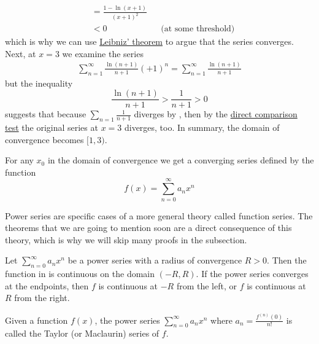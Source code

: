 \begin{exm}
\begin{align*}
		      & = \frac{1-\ln(x+1)}{(x+1)^2}                                                             \\
		      & < 0                                                      &  & \text{(at some threshold)}
	\end{align*}
	which is why we can use \hyperref[thm-leibniz-test]{Leibniz' theorem}
	to argue that the series converges. Next, at $x=3$ we examine the series
	\begin{align*}
		\sum_{n=1}^\infty \frac{\ln(n+1)}{n+1}(+1)^n = \sum_{n=1}^\infty \frac{\ln(n+1)}{n+1}
	\end{align*}
	but the inequality
	\begin{equation*}
		\frac{\ln(n+1)}{n+1} > \frac{1}{n+1} > 0
	\end{equation*}
	suggests that because $\sum_{n=1}\frac{1}{n+1}$ diverges by ,
	then by the \hyperref[thm-direct-comparison-test-series]{direct comparison test} the original series at
	$x=3$ diverges, too. In summary, the domain of convergence becomes $[1,3)$.
\end{exm}

\begin{definition}\label{def-power-series-function}
	For any $x_0$ in the domain of convergence we get a converging series defined by the function
	\begin{equation}\label{eq-power-series-function}
		f(x)=\sum_{n=0}^\infty a_n x^n
	\end{equation}
\end{definition}

\begin{rem}
	Power series are specific cases of a more general theory called function series.
	The theorems that we are going to mention soon are a direct consequence of this
	theory, which is why we will skip many proofs in the subsection.
\end{rem}

\begin{thm}\label{thm-power-series-continuous}
	Let $\sum_{n=0}^\infty a_n x^n$ be a power series with a radius of convergence $R>0$.
	Then the function in  is continuous on
	the domain $(-R,R)$. If the power series converges at the endpoints, then $f$ is
	continuous at $-R$ from the left, or $f$ is continuous at $R$ from the right.
\end{thm}

\begin{definition}\label{def-power-series-taylor-maclaurin-series}
	Given a function $f(x)$, the power series $\sum_{n=0}^\infty a_n x^n$ where
	$a_n=\tfrac{f^{(n)}(0)}{n!}$ is called the Taylor (or Maclaurin) series of $f$.
\end{definition}

